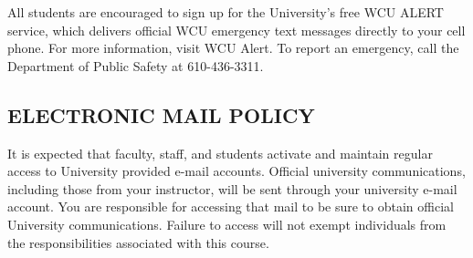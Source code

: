 \documentclass[
]{article}
\begin{document}
All students are encouraged to sign up for the University's free WCU
ALERT service, which delivers official WCU emergency text messages
directly to your cell phone. For more information, visit WCU Alert. To
report an emergency, call the Department of Public Safety at
610-436-3311.

\hypertarget{electronic-mail-policy}{%
\subsection{ELECTRONIC MAIL POLICY}\label{electronic-mail-policy}}

It is expected that faculty, staff, and students activate and maintain
regular access to University provided e-mail accounts. Official
university communications, including those from your instructor, will be
sent through your university e-mail account. You are responsible for
accessing that mail to be sure to obtain official University
communications. Failure to access will not exempt individuals from the
responsibilities associated with this course.
\end{document}

